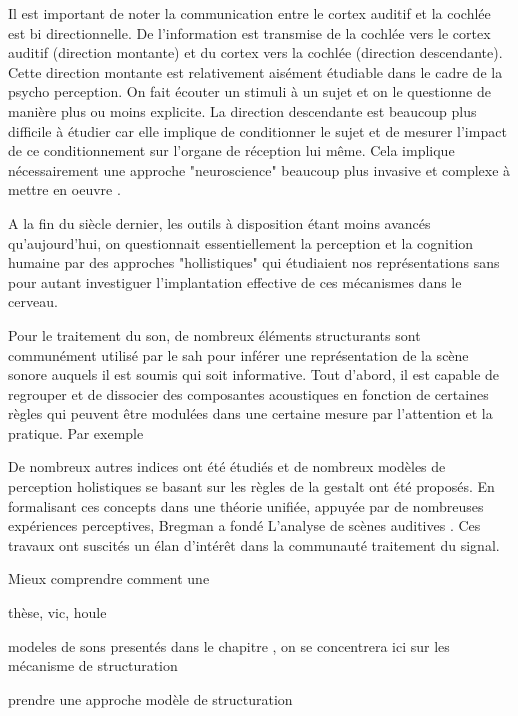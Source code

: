 Il est important de noter la communication entre le cortex auditif et la cochlée est bi directionnelle. De l'information est transmise de la cochlée vers le cortex auditif (direction montante) et du cortex vers la cochlée (direction descendante). Cette direction montante est relativement aisément étudiable dans le cadre de la psycho perception. On fait écouter un stimuli à un sujet et on le questionne de manière plus ou moins explicite. La direction descendante est beaucoup plus difficile à étudier car elle implique de conditionner le sujet et de mesurer l'impact de ce conditionnement sur l'organe de réception lui même. Cela implique nécessairement une approche "neuroscience" beaucoup plus invasive et complexe à mettre en oeuvre .

A la fin du siècle dernier, les outils à disposition étant moins avancés qu'aujourd'hui, on questionnait essentiellement la perception et la cognition humaine par des approches "hollistiques" qui étudiaient nos représentations sans pour autant investiguer l'implantation effective de ces mécanismes dans le cerveau.

Pour le traitement du son, de nombreux éléments structurants sont communément utilisé par le sah pour inférer une représentation de la scène sonore auquels il est soumis qui soit informative. Tout d'abord, il est capable de regrouper et de dissocier des composantes acoustiques en fonction de certaines règles qui peuvent être modulées dans une certaine mesure par l'attention et la pratique. Par exemple

De nombreux autres indices ont été étudiés et de nombreux modèles de perception holistiques se basant sur les règles de la gestalt ont été proposés. En formalisant ces concepts dans une théorie unifiée, appuyée par de nombreuses expériences perceptives, Bregman a fondé
L'analyse de scènes auditives \cite{bregman1994auditory}. Ces travaux ont suscités un élan d'intérêt dans la communauté traitement du signal.


Mieux comprendre comment une

thèse, vic, houle

modeles de sons presentés dans le chapitre , on se concentrera ici sur les mécanisme de structuration

prendre une approche modèle de structuration

